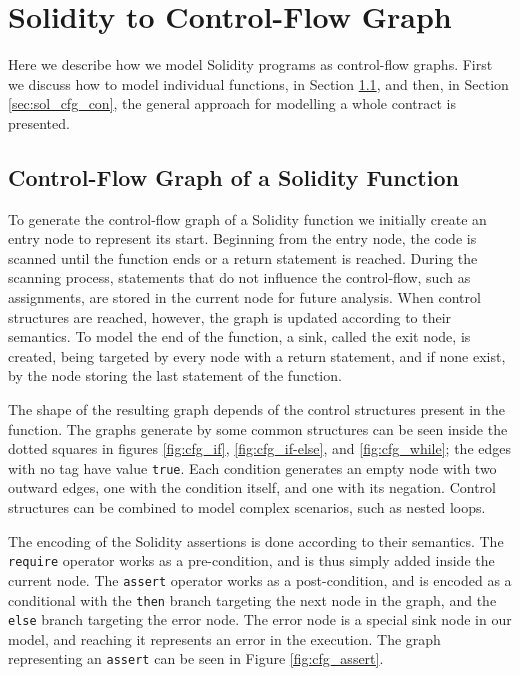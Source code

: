\section{Solidity to Control-Flow Graph}

Here we describe how we model Solidity programs as control-flow graphs. First we discuss how to model individual functions, in Section \ref{sec:sol_cfg_fun}, and then, in Section \ref{sec:sol_cfg_con}, the general approach for modelling a whole contract is presented.


\subsection{Control-Flow Graph of a Solidity Function} \label{sec:sol_cfg_fun}

To generate the control-flow graph of a Solidity function we initially create an entry node to represent its start. Beginning from the entry node, the code is scanned until the function ends or a return statement is reached. During the scanning process, statements that do not influence the control-flow, such as assignments, are stored in the current node for future analysis. When control structures are reached, however, the graph is updated according to their semantics. To model the end of the function, a sink, called the exit node, is created, being targeted by every node with a return statement, and if none exist, by the node storing the last statement of the function.

The shape of the resulting graph depends of the control structures present in the function. The graphs generate by some common structures can be seen inside the dotted squares in figures \ref{fig:cfg_if}, \ref{fig:cfg_if-else}, and \ref{fig:cfg_while}; the edges with no tag have value \texttt{true}. Each condition generates an empty node with two outward edges, one with the condition itself, and one with its negation. Control structures can be combined to model complex scenarios, such as nested loops.

The encoding of the Solidity assertions is done according to their semantics. The \texttt{require} operator works as a pre-condition, and is thus simply added inside the current node. The \texttt{assert} operator works as a post-condition, and is encoded as a conditional with the \texttt{then} branch targeting the next node in the graph, and the \texttt{else} branch targeting the error node. The error node is a special sink node in our model, and reaching it represents an error in the execution. The graph representing an \texttt{assert} can be seen in Figure \ref{fig:cfg_assert}.

